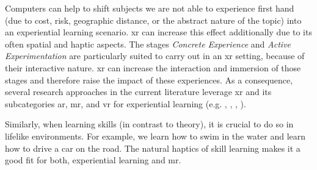 Computers can help to shift subjects we are not able to experience first hand (due to cost, risk, geographic distance, or the abstract nature of the topic) into an experiential learning scenario. \Acrfull{xr} can increase this effect additionally due to its often spatial and haptic aspects.
The stages \emph{Concrete Experience} and \emph{Active Experimentation} are particularly suited to carry out in an \acrshort{xr} setting, because of their interactive nature. \acrshort{xr} can increase the interaction and immersion of those stages and therefore raise the impact of these experiences.
As a consequence, several research approaches in the current literature leverage \acrshort{xr} and its subcategories \acrshort{ar}, \acrshort{mr}, and \acrshort{vr} for experiential learning (e.g. \cite{asad2021virtual}, \cite{majgaard2020virtual}, \cite{wang2007experiential}, \cite{pueschel:2013:MRCG}).

Similarly, when learning skills (in contrast to theory), it is crucial to do so in lifelike environments. For example, we learn how to swim in the water and learn how to drive a car on the road. The natural haptics of skill learning makes it a good fit for both, experiential learning and \acrshort{mr}.